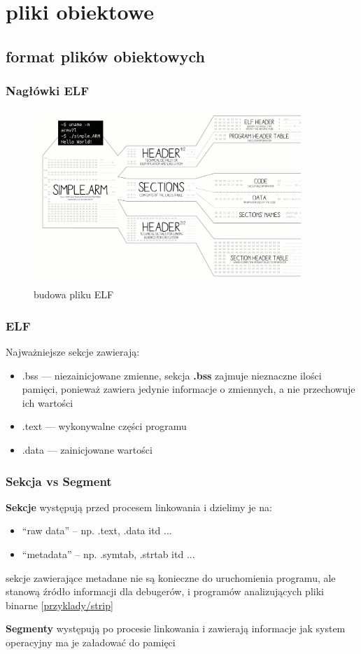 \section{pliki obiektowe}
\subsection{format plików obiektowych}
\begin{frame}[t]\frametitle{Nagłówki ELF}
  \begin{figure}
    \includegraphics[width=0.9\textwidth]{ELFHeader.png}
    \caption{budowa pliku ELF \cite{ELFHeader}}
  \end{figure}
\end{frame}

\begin{frame}[t]\frametitle{ELF}
  \cite{ELF}Najważniejsze sekcje zawierają:
  \begin{itemize}
  \item{.bss --- } niezainicjowane zmienne, sekcja \textbf{.bss} zajmuje
    nieznaczne ilości pamięci, ponieważ zawiera jedynie informacje o
    zmiennych, a nie przechowuje ich wartości
  \item{.text --- } wykonywalne części programu
  \item{.data --- } zainicjowane wartości
  \end{itemize}
\end{frame}

\begin{frame}[t]\frametitle{Sekcja vs Segment}

  \textbf{Sekcje} występują przed procesem linkowania i dzielimy je na:
  \begin{itemize}
  \item ``raw data'' -- np. .text, .data itd ...
  \item ``metadata'' -- np. .symtab, .strtab itd ...
  \end{itemize}

  sekcje zawierające metadane nie są konieczne do uruchomienia programu,
  ale stanową źródło informacji dla debugerów, i programów analizujących
  pliki binarne
  [\url{przyklady/strip}]
  
  \textbf{Segmenty} występują po procesie linkowania i zawierają informacje jak
  system operacyjny ma je załadować do pamięci
\end{frame}

